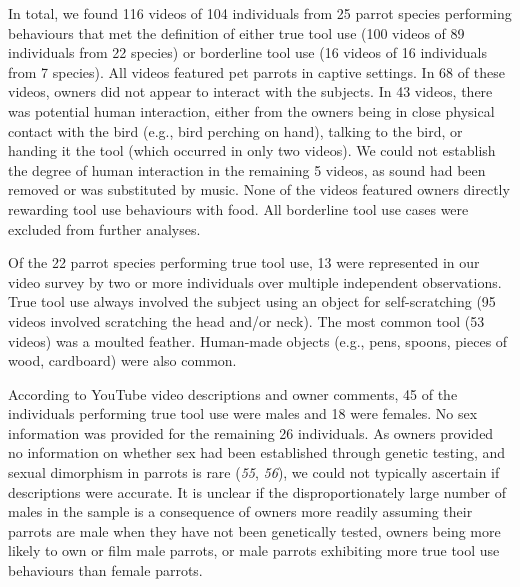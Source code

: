 \documentclass[
  man,floatsintext]{apa6}
\begin{document}
In total, we found 116 videos of
104 individuals from
25
parrot species performing behaviours that met the definition of either true tool
use (100 videos of
89
individuals from
22
species) or borderline tool use (16 videos of
16
individuals from
7
species). All videos featured pet parrots in captive settings. In
68 of these
videos, owners did not appear to interact with the subjects. In
43 videos,
there was potential human interaction, either from the owners being in close physical
contact with the bird (e.g., bird perching on hand), talking to the bird, or
handing it the tool (which occurred in only two videos). We could not establish
the degree of human interaction in the remaining
5
videos, as sound had been removed or was substituted by music. None of the
videos featured owners directly rewarding tool use behaviours with food. All
borderline tool use cases were excluded from further analyses.

Of the 22
parrot species performing true tool use,
13
were represented in our video survey by two or more individuals over multiple
independent observations. True tool use always involved the subject using an
object for self-scratching (95
videos involved scratching the head and/or neck). The most common tool (53
videos) was a moulted feather. Human-made objects (e.g., pens, spoons, pieces of
wood, cardboard) were also common.

According to YouTube video descriptions and owner comments,
45
of the individuals performing true tool use were males and
18
were females. No sex information was provided for the remaining
26
individuals. As owners provided no information on whether sex had been
established through genetic testing, and sexual dimorphism in parrots is
rare (\emph{55}, \emph{56}), we could not typically ascertain if descriptions
were accurate. It is unclear if the disproportionately large number of males in
the sample is a consequence of owners more readily assuming their parrots are
male when they have not been genetically tested, owners being more likely to own
or film male parrots, or male parrots exhibiting more true tool use behaviours
than female parrots.
\end{document}
